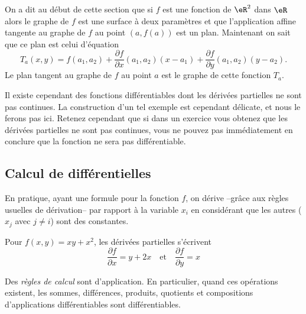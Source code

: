 On a dit au début de cette section que si $f$ est une fonction de $\eR^2$ dans $\eR$ alors le graphe de $f$ est une surface à deux paramètres et que l'application affine tangente au graphe de $f$ au point $(a, f(a))$ est un plan. Maintenant on sait que ce plan est celui d'équation 
\begin{equation}
	T_a(x,y)=f(a_1,a_2)+\frac{ \partial f }{ \partial x }(a_1,a_2)(x-a_1)+\frac{ \partial f }{ \partial y }(a_1,a_2)(y-a_2).
\end{equation}
Le plan tangent au graphe de $f$ au point $a$ est le graphe de cette fonction $T_a$.

\begin{remark}
	Il existe cependant des fonctions différentiables dont les dérivées partielles ne sont pas continues. La construction d'un tel exemple est cependant délicate, et nous le ferons pas ici. Retenez cependant que si dans un exercice vous obtenez que les dérivées partielles ne sont pas continues, vous ne pouvez pas immédiatement en conclure que la fonction ne sera pas différentiable.	 
\end{remark}


                    \subsection{Calcul de différentielles}


\begin{remark}      \label{deriveepartielles}
  En pratique, ayant une formule pour la fonction $f$, on dérive --grâce aux règles usuelles de dérivation-- par rapport à la variable $x_i$ en considérant que les autres ($x_j$ avec $j \neq i$) sont des constantes.
\end{remark}

\begin{example}Pour $f(x,y) = xy + x^2$, les dérivées partielles
  s'écrivent
  \begin{equation*}
    \frac{\partial f}{\partial x} = y + 2x \quad\text{et}\quad \frac{\partial f}{\partial y} = x
  \end{equation*}
\end{example}


Des \emph{règles de calcul} sont d'application. En particulier, quand
ces opérations existent, les sommes, différences, produits, quotients
et compositions d'applications différentiables sont différentiables.

